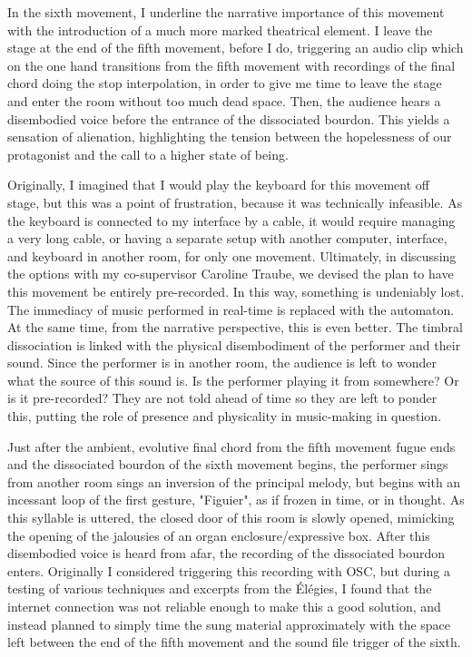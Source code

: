 \documentclass[12pt,twoside,maitrise]{dms_ks}
\theoremstyle{definition}
\begin{document}
In the sixth movement, I underline the narrative importance of this movement with the introduction of a much more marked theatrical element.
I leave the stage at the end of the fifth movement, before I do, triggering an audio clip which on the one hand transitions from the fifth movement with recordings of the final chord doing the stop interpolation, in order to give me time to leave the stage and enter the room without too much dead space.
Then, the audience hears a disembodied voice before the entrance of the dissociated bourdon.
This yields a sensation of alienation, highlighting the tension between the hopelessness of our protagonist and the call to a higher state of being.

Originally, I imagined that I would play the keyboard for this movement off stage, but this was a point of frustration, because it was technically infeasible.
As the keyboard is connected to my interface by a cable, it would require managing a very long cable, or having a separate setup with another computer, interface, and keyboard in another room, for only one movement.
Ultimately, in discussing the options with my co-supervisor Caroline Traube, we devised the plan to have this movement be entirely pre-recorded.
In this way, something is undeniably lost.
The immediacy of music performed in real-time is replaced with the automaton.
At the same time, from the narrative perspective, this is even better.
The timbral dissociation is linked with the physical disembodiment of the performer and their sound.
Since the performer is in another room, the audience is left to wonder what the source of this sound is.
Is the performer playing it from somewhere?
Or is it pre-recorded?
They are not told ahead of time so they are left to ponder this, putting the role of presence and physicality in music-making in question.

Just after the ambient, evolutive final chord from the fifth movement fugue ends and the dissociated bourdon of the sixth movement begins, the performer sings from another room sings an inversion of the principal melody, but begins with an incessant loop of the first gesture, "Figuier", as if frozen in time, or in thought.
As this syllable is uttered, the closed door of this room is slowly opened, mimicking the opening of the jalousies of an organ enclosure/expressive box.
After this disembodied voice is heard from afar, the recording of the dissociated bourdon enters.
Originally I considered triggering this recording with OSC, but during a testing of various techniques and excerpts from the Élégies, I found that the internet connection was not reliable enough to make this a good solution, and instead planned to simply time the sung material approximately with the space left between the end of the fifth movement and the sound file trigger of the sixth.
\end{document}
